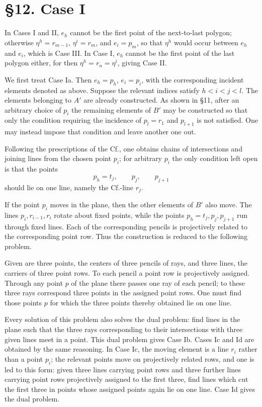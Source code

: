 \documentclass[11pt]{article}
\newcommand{\Cf}{\textup{Cf.}}
\begin{document}
\section*{\S 12. Case I}
In Cases I and II, $e_h$ cannot be the first point of the next-to-last polygon; otherwise $\eta^h=r_{m-1}$, $\eta^i=r_m$, and $e_i=p_m$, so that $\eta^h$ would occur between $e_h$ and $e_i$, which is Case III. In Case I, $e_h$ cannot be the first point of the last polygon either, for then $\eta^h=r_n=\eta^i$, giving Case II.

We first treat Case Ia. Then $e_h=p_h$, $e_i=p_i$, with the corresponding incident elements denoted as above. Suppose the relevant indices satisfy $h<i<j<l$. The elements belonging to $A'$ are already constructed. As shown in \S 11, after an arbitrary choice of $p_i$ the remaining elements of $B'$ may be constructed so that only the condition requiring the incidence of $p_l=r_1$ and $p_{l+1}$ is not satisfied. One may instead impose that condition and leave another one out.

Following the prescriptions of the \Cf, one obtains chains of intersections and joining lines from the chosen point $p_i$; for arbitrary $p_i$ the only condition left open is that the points
\[
p_h=t_j,
\qquad p_j,
\qquad p_{j+1}
\]
should lie on one line, namely the \Cf-line $r_j$.

If the point $p_i$ moves in the plane, then the other elements of $B'$ also move. The lines $p_i,r_{i-1},r_i$ rotate about fixed points, while the points $p_h=t_j,p_j,p_{j+1}$ run through fixed lines. Each of the corresponding pencils is projectively related to the corresponding point row. Thus the construction is reduced to the following problem.

Given are three points, the centers of three pencils of rays, and three lines, the carriers of three point rows. To each pencil a point row is projectively assigned. Through any point $p$ of the plane there passes one ray of each pencil; to these three rays correspond three points in the assigned point rows. One must find those points $p$ for which the three points thereby obtained lie on one line.

Every solution of this problem also solves the dual problem: find lines in the plane such that the three rays corresponding to their intersections with three given lines meet in a point. This dual problem gives Case Ib. Cases Ic and Id are obtained by the same reasoning. In Case Ic, the moving element is a line $r_i$ rather than a point $p_i$; the relevant points move on projectively related rows, and one is led to this form: given three lines carrying point rows and three further lines carrying point rows projectively assigned to the first three, find lines which cut the first three in points whose assigned points again lie on one line. Case Id gives the dual problem.
\end{document}
